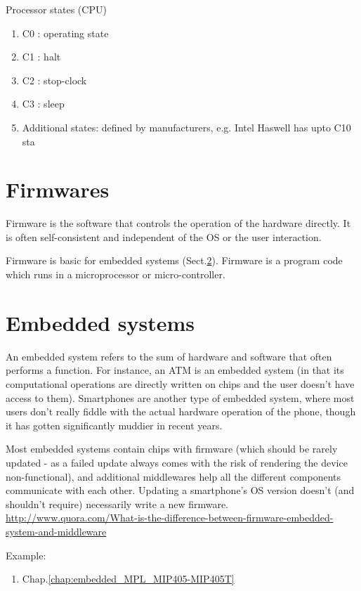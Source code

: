 Processor states (CPU)
\begin{enumerate}
  \item C0 : operating state
  \item C1 : halt
  \item C2 : stop-clock
  \item C3 : sleep
  \item Additional states: defined by manufacturers, e.g. Intel Haswell has upto
  C10 sta
\end{enumerate}

\section{Firmwares}
\label{sec:firmware}

Firmware is the software that controls the operation of the hardware directly.
It is often self-consistent and independent of the OS or the user interaction.

Firmware is basic for embedded systems (Sect.\ref{sec:embedded-system}).
Firmware is a program code which runs in a microprocessor or micro-controller.

\section{Embedded systems}
\label{sec:embedded-system}

An embedded system refers to the sum of hardware and software that often
performs a function. For instance, an ATM is an embedded system (in that its
computational operations are directly written on chips and the user doesn't have
access to them). Smartphones are another type of embedded system, where most
users don't really fiddle with the actual hardware operation of the phone,
though it has gotten significantly muddier in recent years.

Most embedded systems contain chips with firmware (which should be rarely
updated - as a failed update always comes with the risk of rendering the device
non-functional), and additional middlewares help all the different components
communicate with each other. Updating a smartphone's OS version doesn't (and
shouldn't require) necessarily write a new firmware.
\url{http://www.quora.com/What-is-the-difference-between-firmware-embedded-system-and-middleware}

Example:
\begin{enumerate}
  \item Chap.\ref{chap:embedded_MPL_MIP405-MIP405T}
\end{enumerate}

